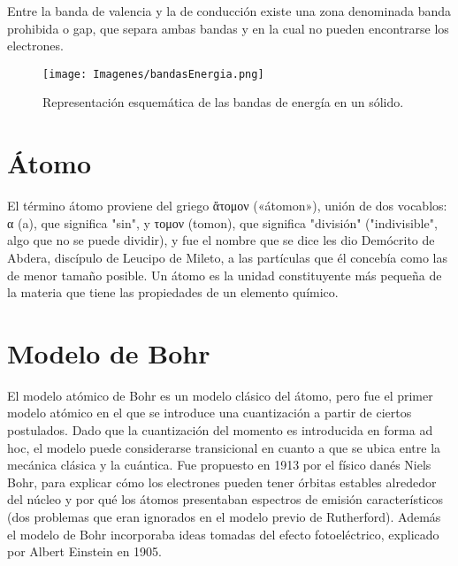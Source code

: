 \documentclass{article}
\begin{document}
Entre la banda de valencia y la de conducción existe una zona denominada banda prohibida o gap, que separa ambas bandas y en la cual no pueden encontrarse los electrones.\citep{TeorB}

\begin{figure}
    \centering
    \texttt{[image: Imagenes/bandasEnergia.png]}
    \caption{Representación esquemática de las bandas de energía en un sólido.}
    \label{fig:bandasEnergia}
\end{figure}

\section{Átomo}

El término átomo proviene del griego ἄτομον («átomon»), unión de dos vocablos: α (a), que significa "sin", y τομον (tomon), que significa "división" ("indivisible", algo que no se puede dividir), y fue el nombre que se dice les dio Demócrito de Abdera, discípulo de Leucipo de Mileto, a las partículas que él concebía como las de menor tamaño posible. Un átomo es la unidad constituyente más pequeña de la materia que tiene las propiedades de un elemento químico.\citep{Atomo}


\section{Modelo de Bohr}

El modelo atómico de Bohr es un modelo clásico del átomo, pero fue el primer modelo atómico en el que se introduce una cuantización a partir de ciertos postulados. Dado que la cuantización del momento es introducida en forma ad hoc, el modelo puede considerarse transicional en cuanto a que se ubica entre la mecánica clásica y la cuántica. Fue propuesto en 1913 por el físico danés Niels Bohr, para explicar cómo los electrones pueden tener órbitas estables alrededor del núcleo y por qué los átomos presentaban espectros de emisión característicos (dos problemas que eran ignorados en el modelo previo de Rutherford). Además el modelo de Bohr incorporaba ideas tomadas del efecto fotoeléctrico, explicado por Albert Einstein en 1905.\citep{BohrAtomo}
\end{document}
